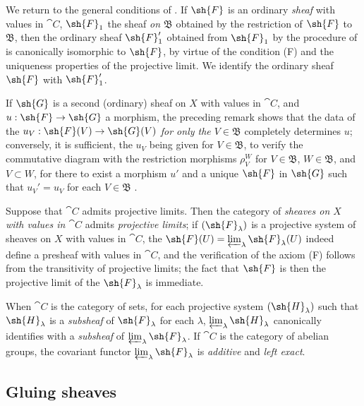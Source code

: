 \begin{env}[3.2.5]
\label{0.3.2.5}
We return to the general conditions of . If $\sh{F}$ is an
ordinary \emph{sheaf} with values in $\cat{C}$, $\sh{F}_1$ the sheaf \emph{on
$\mathfrak{B}$} obtained by the restriction of $\sh{F}$ to $\mathfrak{B}$, then
the ordinary sheaf $\sh{F}_1'$ obtained from $\sh{F}_1$ by the procedure of
 is canonically isomorphic to $\sh{F}$, by virtue of the
condition (F) and the uniqueness properties of the projective limit. We identify
the ordinary sheaf $\sh{F}$ with $\sh{F}_1'$.

If $\sh{G}$ is a second (ordinary) sheaf on $X$ with values in $\cat{C}$, and
$u:\sh{F}\to\sh{G}$ a morphism, the preceding remark shows that the data of the
$u_V:\sh{F}(V)\to\sh{G}(V)$ \emph{for only the $V\in\mathfrak{B}$} completely
determines $u$; conversely, it is sufficient, the $u_V$ being given for
$V\in\mathfrak{B}$, to verify the commutative diagram with the restriction
morphisms $\rho_V^W$ for $V\in\mathfrak{B}$, $W\in\mathfrak{B}$, and
$V\subset W$, for there to exist a morphism $u'$ and a unique $\sh{F}$ in
$\sh{G}$ such that $u_V'=u_V$ for each $V\in\mathfrak{B}$ .
\end{env}

\begin{env}[3.2.6]
\label{0.3.2.6}
Suppose that $\cat{C}$ admits projective limits. Then the category of \emph{sheaves
on $X$ with values in $\cat{C}$} admits \emph{projective limits}; if
$(\sh{F}_\lambda)$ is a projective system of sheaves on $X$ with values in $\cat{C}$,
the $\sh{F}(U)=\varprojlim_\lambda\sh{F}_\lambda(U)$ indeed define a presheaf
with values in $\cat{C}$, and the verification of the axiom (F) follows from the
transitivity of projective limits; the fact that $\sh{F}$ is then the projective
limit of the $\sh{F}_\lambda$ is immediate.

When $\cat{C}$ is the category of sets, for each projective system
$(\sh{H}_\lambda)$ such
that $\sh{H}_\lambda$ is a \emph{subsheaf} of $\sh{F}_\lambda$ for each
$\lambda$, $\varprojlim_\lambda\sh{H}_\lambda$ canonically identifies with
a \emph{subsheaf} of $\varprojlim_\lambda\sh{F}_\lambda$. If $\cat{C}$ is the
category of abelian groups, the covariant functor
$\varprojlim_\lambda\sh{F}_\lambda$ is \emph{additive} and \emph{left exact}.
\end{env}

\subsection{Gluing sheaves}
\label{subsection:0.3.3}

